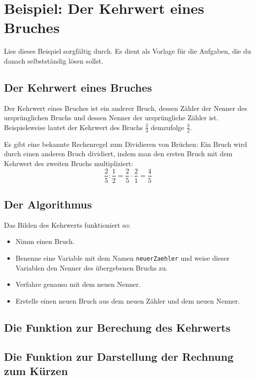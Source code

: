 \section{Beispiel: Der Kehrwert eines Bruches}

Lies dieses Beispiel sorgfältig durch. Es dient als Vorlage für die Aufgaben, die du danach selbstständig lösen sollst.

\subsection{Der Kehrwert eines Bruches}

Der Kehrwert eines Bruches ist ein anderer Bruch, dessen Zähler der Nenner des ursprünglichen Bruchs und dessen Nenner der ursprüngliche Zähler ist. Beispielsweise lautet der Kehrwert des Bruchs $\frac{2}{3}$ demzufolge $\frac{3}{2}$.

Es gibt eine bekannte Rechenregel zum Dividieren von Brüchen: Ein Bruch wird durch einen anderen Bruch dividiert, indem man den ersten Bruch mit dem Kehrwert des zweiten Bruchs multipliziert:
\[
\frac{2}{5} : \frac{1}{2} = \frac{2}{5} \cdot \frac{2}{1} = \frac{4}{5}
\]

\subsection{Der Algorithmus}

Das Bilden des Kehrwerts funktioniert so:
\begin{itemize}
	\item Nimm einen Bruch.
	\item Benenne eine Variable mit dem Namen \texttt{neuerZaehler} und weise dieser Variablen den Nenner des übergebenen Bruchs zu.
	\item Verfahre genauso mit dem neuen Nenner.
	\item Erstelle einen neuen Bruch aus dem neuen Zähler und dem neuen Nenner.
\end{itemize}

\subsection{Die Funktion zur Berechung des Kehrwerts}

\begin{codePython}
\end{codePython}

\subsection{Die Funktion zur Darstellung der Rechnung zum Kürzen}

